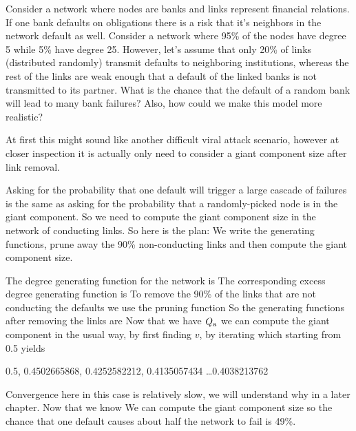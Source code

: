 
\label{exAttackBank}Consider a network where nodes are banks and links represent financial relations. If one bank defaults on obligations there is a risk that it's neighbors in the network default as well. Consider a network where 95\% of the nodes have degree 5 while 5\% have degree 25. However, let's assume that only 20\% of links (distributed randomly) transmit defaults to neighboring institutions, whereas the rest of the links are weak enough that a default of the linked banks is not transmitted to its partner. What is the chance that the default of a random bank will lead to many bank failures? Also, how could we make this model more realistic?

\solution
At first this might sound like another difficult viral attack scenario, however at closer inspection it is actually only need to consider a giant component size after link removal. 

Asking for the probability that one default will trigger a large cascade of failures is the same as asking for the probability that a randomly-picked node is in the giant component. So we need to compute the giant component size in the network of conducting links. So here is the plan: We write the generating functions, prune away the 90\% non-conducting links and then compute the giant component size. 

The degree generating function for the network is 
The corresponding excess degree generating function is 
To remove the 90\% of the links that are not conducting the defaults we 
use the pruning function 
So the generating functions after removing the links are 
Now that we have $Q_{\rm a}$ we can compute the giant component in the usual way, by first finding $v$, by iterating
which starting from 0.5 yields
\begin{center}
    0.5, 0.4502665868, 0.4252582212, 0.4135057434  \ldots 0.4038213762
\end{center}
Convergence here in this case is relatively slow, we will understand why in a later chapter. Now that we know 
We can compute the giant component size
so the chance that one default causes about half the network to fail is 49\%. 

